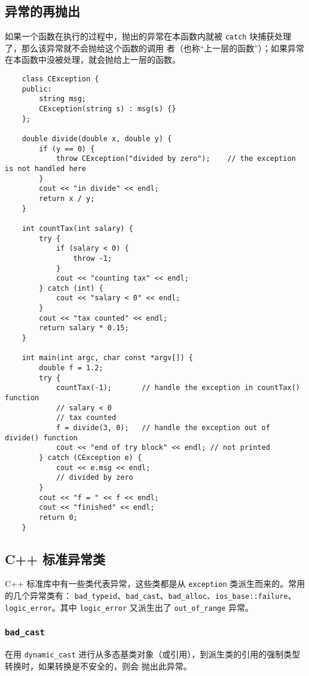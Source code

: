 \documentclass[UTF8]{ctexart}
\begin{document}
\subsection{异常的再抛出}
如果一个函数在执行的过程中，抛出的异常在本函数内就被 \texttt{catch} 块捕获处理了，那么该异常就不会抛给这个函数的调用
者（也称“上一层的函数”）；如果异常在本函数中没被处理，就会抛给上一层的函数。

\begin{verbatim}
    class CException {
    public:
        string msg;
        CException(string s) : msg(s) {}
    };

    double divide(double x, double y) {
        if (y == 0) {
            throw CException("divided by zero");    // the exception is not handled here
        }
        cout << "in divide" << endl;
        return x / y;
    }

    int countTax(int salary) {
        try {
            if (salary < 0) {
                throw -1;
            }
            cout << "counting tax" << endl;
        } catch (int) {
            cout << "salary < 0" << endl;
        }
        cout << "tax counted" << endl;
        return salary * 0.15;
    }

    int main(int argc, char const *argv[]) {
        double f = 1.2;
        try {
            countTax(-1);       // handle the exception in countTax() function
            // salary < 0
            // tax counted
            f = divide(3, 0);   // handle the exception out of divide() function
            cout << "end of try block" << endl; // not printed
        } catch (CException e) {
            cout << e.msg << endl;
            // divided by zero
        }
        cout << "f = " << f << endl;
        cout << "finished" << endl;
        return 0;
    }
\end{verbatim}

\subsection{C++ 标准异常类}
C++ 标准库中有一些类代表异常，这些类都是从 \texttt{exception} 类派生而来的。常用的几个异常类有：
\texttt{bad\_typeid}、\texttt{bad\_cast}、\texttt{bad\_alloc}、\texttt{ios\_base::failure}、
\texttt{logic\_error}。其中 \texttt{logic\_error} 又派生出了 \texttt{out\_of\_range} 异常。

\subsubsection{\texttt{bad\_cast}}
在用 \texttt{dynamic\_cast} 进行从多态基类对象（或引用），到派生类的引用的强制类型转换时，如果转换是不安全的，则会
抛出此异常。
\end{document}
